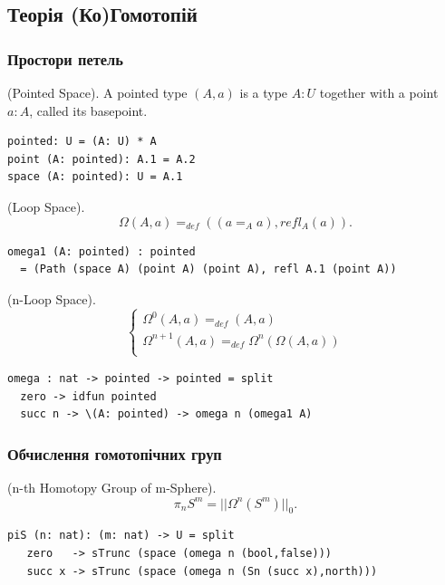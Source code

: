 \begin{definition}
\subsection{Теорія (Ко)Гомотопій}

\subsubsection{Простори петель}

\begin{definition} (Pointed Space). A pointed type $(A,a)$ is a type $A:U$
together with a point $a:A$, called its basepoint.
\begin{lstlisting}
pointed: U = (A: U) * A
point (A: pointed): A.1 = A.2
space (A: pointed): U = A.1
\end{lstlisting}
\end{definition}

\begin{definition} (Loop Space).
$$\Omega(A,a) =_{def} ((a =_A a), refl_A(a)).$$
\begin{lstlisting}
omega1 (A: pointed) : pointed
  = (Path (space A) (point A) (point A), refl A.1 (point A))
\end{lstlisting}
\end{definition}

\begin{definition} (n-Loop Space).
$$
\begin{cases}
\Omega^0(A, a) =_{def} (A, a)\\
\Omega^{n+1}(A,a) =_{def} \Omega^{n}(\Omega(A,a))\\
\end{cases}
$$
\begin{lstlisting}
omega : nat -> pointed -> pointed = split
  zero -> idfun pointed
  succ n -> \(A: pointed) -> omega n (omega1 A)
\end{lstlisting}
\end{definition}

\subsubsection{Обчислення гомотопічних груп}

\begin{definition} (n-th Homotopy Group of m-Sphere).
$$\pi_{n}S^{m} = ||\Omega^{n}(S^{m})||_0.$$
\begin{lstlisting}
piS (n: nat): (m: nat) -> U = split
   zero   -> sTrunc (space (omega n (bool,false)))
   succ x -> sTrunc (space (omega n (Sn (succ x),north)))
\end{lstlisting}
\end{definition}


\end{definition}
